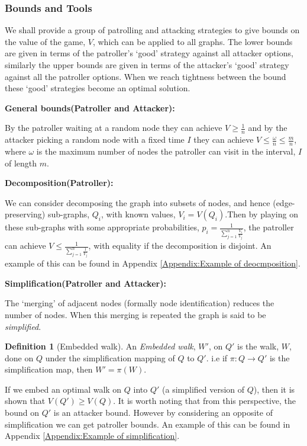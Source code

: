 \documentclass[a4paper,10pt]{article}
\theoremstyle{definition}
\newtheorem{definition}[theorem]{Definition}
\theoremstyle{definition}
\theoremstyle{remark}
\theoremstyle{definition}
\begin{document}
\subsubsection{Bounds and Tools}
We shall provide a group of patrolling and attacking strategies to give bounds on the value of the game, $V$, which can be applied to all graphs. The lower bounds are given in terms of the patroller's `good' strategy against all attacker options, similarly the upper bounds are given in terms of the attacker's `good' strategy against all the patroller options. When we reach tightness between the bound these `good' strategies become an optimal solution.

\textbf{General bounds(Patroller and Attacker):}

By the patroller waiting at a random node they can achieve $V \geq \frac{1}{n}$ and by the attacker picking a random node with a fixed time $I$ they can achieve $V \leq \frac{\omega}{n} \leq \frac{m}{n}$, where $\omega$ is the maximum number of nodes the patroller can visit in the interval, $I$ of length $m$.

\textbf{Decomposition(Patroller):}

We can consider decomposing the graph into subsets of nodes, and hence (edge-preserving) sub-graphs, $Q_{i}$, with known values, $V_{i}=V(Q_{i})$.Then by playing on these sub-graphs with some appropriate probabilities, $p_{i}= \frac{1}{\sum\limits_{j=1}^{n} \frac{V_{i} }{V_{j}}}$, the patroller can achieve $V \leq \frac{1}{\sum\limits_{j=1}^{n} \frac{1}{V_{j}}}$, with equality if the decomposition is disjoint. An example of this can be found in Appendix \ref{Appendix:Example of deocmposition}.

\textbf{Simplification(Patroller and Attacker):}

The `merging' of adjacent nodes (formally node identification) reduces the number of nodes. When this merging is repeated the graph is said to be \textit{simplified}.

\begin{definition}[Embedded walk]
An \textit{Embedded walk}, $W'$, on $Q'$ is the walk, $W$, done on $Q$ under the simplification mapping of $Q$ to $Q'$. i.e if $\pi :Q \rightarrow Q'$ is the simplification map, then $W'=\pi (W)$.
\end{definition}

If we embed an optimal walk on $Q$ into $Q'$ (a simplified version of $Q$), then it is shown that $V(Q') \geq V(Q)$. It is worth noting that from this perspective, the bound on $Q'$ is an attacker bound. However by considering an opposite of simplification we can get patroller bounds. An example of this can be found in Appendix \ref{Appendix:Example of simplification}.
\end{document}
